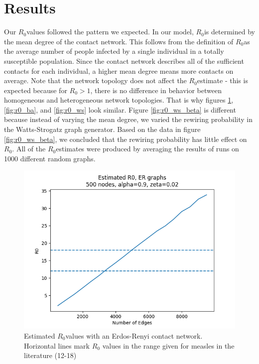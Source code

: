 \documentclass[conference]{IEEEtran}
\newcommand{\ro}{$R_0$}
\begin{document}
\section{Results} %
Our \ro values followed the pattern we expected. In our model, \ro is determined by the mean degree of the contact network. This follows from the definition of \ro as the average number of people infected by a single individual in a totally susceptible population. Since the contact network describes all of the sufficient contacts for each individual, a higher mean degree means more contacts on average. Note that the network topology does not affect the \ro estimate - this is expected because for $R_0 > 1$, there is no difference in behavior between homogeneous and heterogeneous network topologies.\cite{Pastor_satorras2014} That is why figures \ref{fig:r0_er}, \ref{fig:r0_ba}, and \ref{fig:r0_ws} look similar. Figure \ref{fig:r0_ws_beta} is different because instead of varying the mean degree, we varied the rewiring probability in the Watts-Strogatz graph generator. Based on the data in figure \ref{fig:r0_ws_beta}, we concluded that the rewiring probability has little effect on \ro. All of the \ro estimates were produced by averaging the results of runs on 1000 different random graphs.

\begin{figure}[t]
    \centering
    \includegraphics[scale=0.5]{images/est_r0_er.png}
    \caption{Estimated \ro values with an Erdos-Renyi contact network. Horizontal lines mark $R_0$ values in the range given for measles in the literature (12-18)}
    \label{fig:r0_er}
\end{figure}
\end{document}
